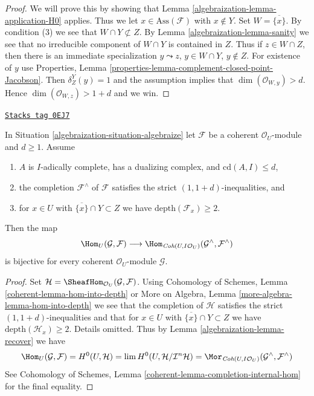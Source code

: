 \begin{proof}

We will prove this by showing that Lemma \ref{algebraization-lemma-application-H0} applies.
Thus we let $x \in \text{Ass}(\mathcal{F})$ with $x \not \in Y$.
Set $W = \overline{\{x\}}$.
By condition (3) we see that $W \cap Y \not \subset Z$.
By Lemma \ref{algebraization-lemma-sanity} we see that no irreducible
component of $W \cap Y$ is contained in $Z$.
Thus if $z \in W \cap Z$, then there is an immediate
specialization $y \leadsto z$, $y \in W \cap Y$, $y \not \in Z$.
For existence of $y$ use
Properties, Lemma \ref{properties-lemma-complement-closed-point-Jacobson}.
Then $\delta^Y_Z(y) = 1$ and the assumption
implies that $\dim(\mathcal{O}_{W, y}) > d$.
Hence $\dim(\mathcal{O}_{W, z}) > 1 + d$ and we win.
\end{proof}

\begin{lemma}
\label{algebraization-lemma-fully-faithful-inequalities}
\href{https://stacks.math.columbia.edu/tag/0EJ7}{\texttt{Stacks tag 0EJ7}}

In Situation \ref{algebraization-situation-algebraize} let $\mathcal{F}$ be a
coherent $\mathcal{O}_U$-module and $d \geq 1$. Assume
\begin{enumerate}
\item $A$ is $I$-adically complete, has a dualizing complex, and
$\text{cd}(A, I) \leq d$,
\item the completion $\mathcal{F}^\wedge$ of $\mathcal{F}$
satisfies the strict $(1, 1 + d)$-inequalities, and
\item for $x \in U$ with $\overline{\{x\}} \cap Y \subset Z$
we have $\text{depth}(\mathcal{F}_x) \geq 2$.
\end{enumerate}
Then the map
$$
\Hom_U(\mathcal{G}, \mathcal{F})
\longrightarrow
\Hom_{\textit{Coh}(U, I\mathcal{O}_U)}(\mathcal{G}^\wedge, \mathcal{F}^\wedge)
$$
is bijective for every coherent $\mathcal{O}_U$-module $\mathcal{G}$.
\end{lemma}

\begin{proof}

Set $\mathcal{H} = \SheafHom_{\mathcal{O}_U}(\mathcal{G}, \mathcal{F})$.
Using Cohomology of Schemes, Lemma
\ref{coherent-lemma-hom-into-depth} or
More on Algebra, Lemma \ref{more-algebra-lemma-hom-into-depth}
we see that the completion of $\mathcal{H}$
satisfies the strict $(1, 1 + d)$-inequalities and that for
$x \in U$ with $\overline{\{x\}} \cap Y \subset Z$
we have $\text{depth}(\mathcal{H}_x) \geq 2$. Details omitted.
Thus by Lemma \ref{algebraization-lemma-recover} we have
$$
\Hom_U(\mathcal{G}, \mathcal{F}) =
H^0(U, \mathcal{H}) =
\lim H^0(U, \mathcal{H}/\mathcal{I}^n\mathcal{H}) =
\Mor_{\textit{Coh}(U, I\mathcal{O}_U)}
(\mathcal{G}^\wedge, \mathcal{F}^\wedge)
$$
See Cohomology of Schemes, Lemma \ref{coherent-lemma-completion-internal-hom}
for the final equality.
\end{proof}

